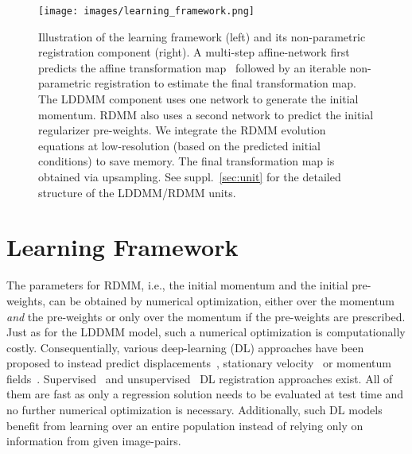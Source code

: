 \documentclass{article}
\numberwithin{equation}{section}
\newcommand{\ie}{{i.e.}}
\begin{document}
\begin{figure}[!t]
\texttt{[image: images/learning\_framework.png]}
\caption{Illustration of the learning framework (left) and its non-parametric registration component (right). A multi-step affine-network first predicts the affine transformation map~\cite{shen2019networks} followed by an iterable non-parametric registration to estimate the final transformation map. The LDDMM component uses one network to generate the initial momentum. RDMM also uses a second network to predict the initial regularizer pre-weights. We integrate the RDMM evolution equations at low-resolution (based on the predicted initial conditions) to save memory. The final transformation map is obtained via upsampling. See suppl.~\ref{sec:unit} for the detailed structure of the LDDMM/RDMM units.} 
\label{fig:framework_rdmm}
\end{figure}


\section{Learning Framework}
\label{sec:learning_framework}

The parameters for RDMM, \ie, the initial momentum and the initial pre-weights, can be obtained by numerical optimization, either over the momentum \emph{and} the pre-weights or only over the momentum if the pre-weights are prescribed. Just as for the LDDMM model, such a numerical optimization is computationally costly. Consequentially, various deep-learning (DL) approaches have been proposed to instead predict displacements~\citep{balakrishnan2018unsupervised,cao2018deformable}, stationary velocity~\citep{rohe2017svf} or momentum fields~\citep{yang2017quicksilver,niethammer2019_cvpr}.  Supervised~\cite{yang2017quicksilver,yang2016fast} and unsupervised~\cite{jaderberg2015spatial,de2017end,li2017non,balakrishnan2018unsupervised,dalca2018unsupervised} DL registration approaches exist. All of them are fast as only a regression solution needs to be evaluated at test time and no further numerical optimization is necessary. Additionally, such DL models benefit from learning over an entire population instead of relying only on information from given image-pairs. 
\end{document}

